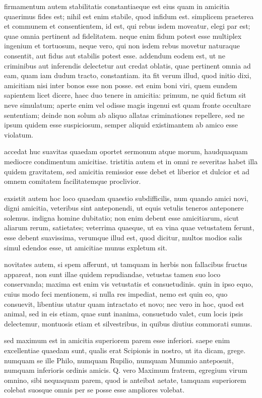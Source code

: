  firmamentum autem stabilitatis constantiaeque est eius quam in amicitia quaerimus fides est; nihil est enim stabile, quod infidum est. simplicem praeterea et communem et consentientem, id est, qui rebus isdem moveatur, elegi par est; quae omnia pertinent ad fidelitatem. neque enim fidum potest esse multiplex ingenium et tortuosum, neque vero, qui non isdem rebus movetur naturaque consentit, aut fidus aut stabilis potest esse. addendum eodem est, ut ne criminibus aut inferendis delectetur aut credat oblatis, quae pertinent omnia ad eam, quam iam dudum tracto, constantiam. ita fit verum illud, quod initio dixi, amicitiam nisi inter bonos esse non posse. est enim boni viri, quem eundem sapientem licet dicere, haec duo tenere in amicitia: primum, ne quid fictum sit neve simulatum; aperte enim vel odisse magis ingenui est quam fronte occultare sententiam; deinde non solum ab aliquo allatas criminationes repellere, sed ne ipsum quidem esse suspiciosum, semper aliquid existimantem ab amico esse violatum.

 accedat huc suavitas quaedam oportet sermonum atque morum, haudquaquam mediocre condimentum amicitiae. tristitia autem et in omni re severitas habet illa quidem gravitatem, sed amicitia remissior esse debet et liberior et dulcior et ad omnem comitatem facilitatemque proclivior.

 exsistit autem hoc loco quaedam quaestio subdifficilis, num quando amici novi, digni amicitia, veteribus sint anteponendi, ut equis vetulis teneros anteponere solemus. indigna homine dubitatio; non enim debent esse amicitiarum, sicut aliarum rerum, satietates; veterrima quaeque, ut ea vina quae vetustatem ferunt, esse debent suavissima, verumque illud est, quod dicitur, multos modios salis simul edendos esse, ut amicitiae munus expletum sit.

 novitates autem, si spem afferunt, ut tamquam in herbis non fallacibus fructus appareat, non sunt illae quidem repudiandae, vetustas tamen suo loco conservanda; maxima est enim vis vetustatis et consuetudinis. quin in ipso equo, cuius modo feci mentionem, si nulla res impediat, nemo est quin eo, quo consuevit, libentius utatur quam intractato et novo; nec vero in hoc, quod est animal, sed in eis etiam, quae sunt inanima, consuetudo valet, cum locis ipsis delectemur, montuosis etiam et silvestribus, in quibus diutius commorati sumus.

 sed maximum est in amicitia superiorem parem esse inferiori. saepe enim excellentiae quaedam sunt, qualis erat Scipionis in nostro, ut ita dicam, grege. numquam se ille Philo, numquam Rupilio, numquam Mummio anteposuit, numquam inferioris ordinis amicis. Q. vero Maximum fratrem, egregium virum omnino, sibi nequaquam parem, quod is anteibat aetate, tamquam superiorem colebat suosque omnis per se posse esse ampliores volebat.


